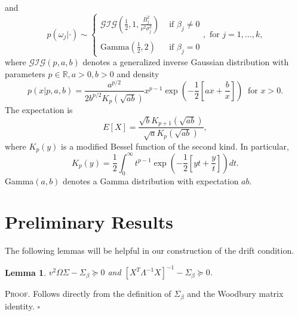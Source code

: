 \documentclass[12pt]{article}
\newtheorem{lemma}[theorem]{Lemma}
\newcounter{ProofCounter}
\newenvironment{Proof}{\stepcounter{ProofCounter}\textsc{Proof.}}{\hfill$\square$}
\begin{document}
and 
\[
  p(\omega_j|\cdot) \sim \left\{ \begin{array}{cl}
      \mathcal{GIG}\left( \frac{1}{2}, 1, \frac{B_j^2}{\nu^2\sigma_j^2} \right) & \text{ if } \beta_j \neq 0 \\ \\
      \text{Gamma}\left( \frac{1}{2}, 2 \right) & \text{ if } \beta_j = 0
  \end{array} \right.,
  \text{ for } j=1,\dots,k,
\]
where $\mathcal{GIG}(p, a, b)$ denotes a generalized inverse Gaussian distribution with parameters $p \in \mathbb{R}, a > 0, b > 0$ and density
\[
  p(x|p, a, b) = \frac{a^{p/2}}{2b^{p/2}K_{p}(\sqrt{ab})}x^{p - 1}\exp\left( -\frac{1}{2}\left[ ax + \frac{b}{x} \right] \right) \ \text{ for } x > 0.
\]
The expectation is
\[
  E[X] = \frac{\sqrt{b}K_{p+1}(\sqrt{ab})}{\sqrt{a}K_{p}(\sqrt{ab})},
\]
where $K_{p}(y)$ is a modified Bessel function of the second kind. In particular, 
\begin{equation}
  K_p(y) = \frac{1}{2} \int_{0}^{\infty} t^{p-1}\exp\left( -\frac{1}{2}\left[yt + \frac{y}{t}\right] \right) dt.
  \label{eq1}
\end{equation}
Gamma$(a,b)$ denotes a Gamma distribution with expectation $ab$.


\section{Preliminary Results}

The following lemmas will be helpful in our construction of the drift condition. \\

\begin{lemma}
  $v^2 \Omega \Sigma - \Sigma_{\beta} \succeq 0$ and $[X^T \Lambda^{-1}X]^{-1} - \Sigma_{\beta} \succeq 0$.
  \label{l1}
\end{lemma}
\begin{Proof}
  Follows directly from the definition of $\Sigma_{\beta}$ and the Woodbury matrix identity.
\end{Proof} \\
\end{document}
